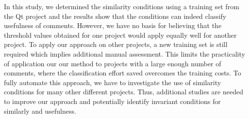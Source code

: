 In this study, we determined the similarity conditions using a training set from the Qt project and the results show that the conditions can indeed classify usefulness of comments.
However, we have no basis for believing that the threshold values obtained for one project would apply equally well for another project. To apply our approach on other projects, a new training set is still required which implies additional manual assessment.
This limits the practicality of application our our method to projects with a large enough number of comments, where the classification effort saved overcomes the training costs.
To fully automate this approach, we have to investigate the use of similarity conditions for many other different projects. Thus, additional studies are needed to improve our approach and potentially identify invariant conditions for similarly and usefulness. 

%


